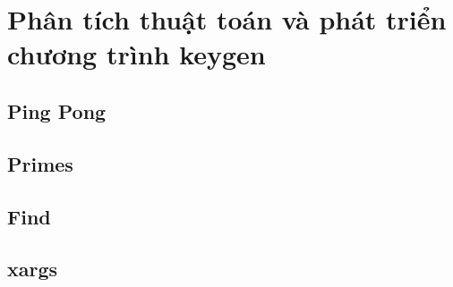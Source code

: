 \section{Phân tích thuật toán và phát triển chương trình keygen}

\subsection{Ping Pong}

\newpage

\subsection{Primes}

\newpage

\subsection{Find}

\newpage

\subsection{xargs}
\newpage